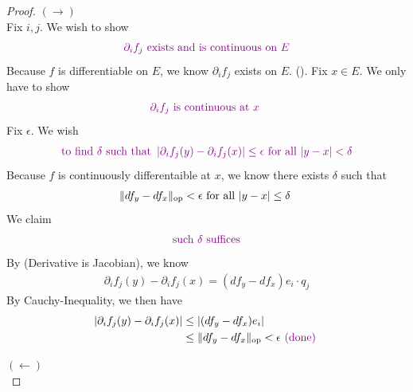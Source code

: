 \documentclass{report}
\begin{document}
\begin{proof}
$(\longrightarrow)$\\

Fix $i,j$. We wish to show 
 \begin{align*}
\textcolor{violet}{\text{ $\partial_if_j$ exists and is continuous on $E$ }}
\end{align*}
Because $f$ is differentiable on $E$, we know  $\partial_i f_j$ exists on $E$. (). Fix $x \in E$. We only have to show 
\begin{align*}
  \textcolor{violet}{\partial_i f_j\text{ is continuous at $x$ }}
\end{align*}
Fix $\epsilon $. We wish 
\begin{align*}
\textcolor{violet}{\text{ to find }\delta\text{ such that } \left|\partial_i f_j(y)-\partial_i f_j(x)\right|\leq \epsilon \text{ for all $\left|y-x\right|<\delta$ }}
\end{align*}
Because $f$ is continuously differentaible at $x$, we know there exists  $\delta$ such that 
\begin{align*}
\| df_y-df_x \|_\text{op}< \epsilon \text{ for all $\left|y-x\right|\leq \delta$ }
\end{align*}
We claim 
\begin{align*}
\textcolor{violet}{\text{ such $\delta$ suffices }}
\end{align*}
By  (Derivative is Jacobian), we know
\begin{align*}
\partial_i f_j(y)-\partial_i f_j(x)=(df_y-df_x)e_i \cdot q_j
\end{align*}
By Cauchy-Inequality, we then have 
\begin{align*}
  \left|\partial_i f_j(y)-\partial_if_j(x)\right|&\leq \left|(df_y-df_x)e_i\right|\\
  &\leq \| df_y-df_x \|_\text{op}<\epsilon \textcolor{violet}{\text{ (done) }}
\end{align*}

$(\longleftarrow)$\\


\end{proof}
\end{document}
